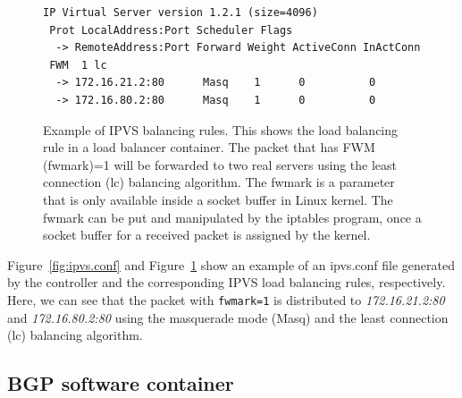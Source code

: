 \begin{figure}[h]
  \centering
  \begin{minipage}{0.95\columnwidth}
   \begin{lstlisting}[frame=lines,breaklines=true,basicstyle=\small\ttfamily]
 IP Virtual Server version 1.2.1 (size=4096)
 Prot LocalAddress:Port Scheduler Flags
  -> RemoteAddress:Port Forward Weight ActiveConn InActConn
 FWM  1 lc
  -> 172.16.21.2:80      Masq    1      0          0         
  -> 172.16.80.2:80      Masq    1      0          0
   \end{lstlisting}
  \end{minipage}

  \par\bigskip
  \centering
  \begin{minipage}{0.9\columnwidth}
    \caption[Example of IPVS balancing rules]{
      Example of IPVS balancing rules.
      This shows the load balancing rule in a load balancer container.
      The packet that has FWM (fwmark)=1 will be forwarded to two real servers using the least connection (lc) balancing algorithm.
      The fwmark is a parameter that is only available inside a socket buffer in Linux kernel.
      The fwmark can be put and manipulated by the iptables program, once a socket buffer for a received packet is assigned by the kernel.
      }
    \label{fig:IPVS rule}
  \end{minipage}
\end{figure}

Figure~\ref{fig:ipvs.conf} and Figure~\ref{fig:IPVS rule} show an example of an ipvs.conf file 
generated by the controller and the corresponding IPVS load balancing rules, respectively.
Here, we can see that the packet with {\tt fwmark=1} \cite{BertHubert2002} is distributed 
to {\em 172.16.21.2:80} and {\em 172.16.80.2:80} using the masquerade mode (Masq) and the least connection (lc) \cite{Zhang2000} balancing algorithm.

\subsection{BGP software container}\label{sec:bgp}

